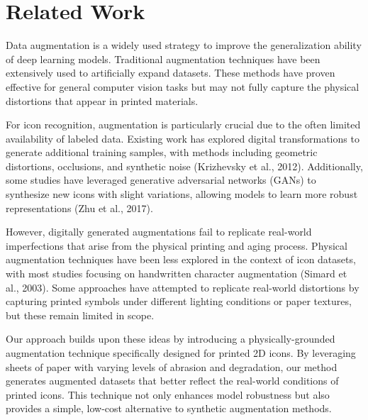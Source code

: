 \section{Related Work}\label{sec:related-work}

Data augmentation is a widely used strategy to improve the generalization ability of deep learning models. Traditional augmentation techniques have been extensively used to artificially expand datasets. These methods have proven effective for general computer vision tasks but may not fully capture the physical distortions that appear in printed materials.

For icon recognition, augmentation is particularly crucial due to the often limited availability of labeled data. Existing work has explored digital transformations to generate additional training samples, with methods including geometric distortions, occlusions, and synthetic noise (Krizhevsky et al., 2012). Additionally, some studies have leveraged generative adversarial networks (GANs) to synthesize new icons with slight variations, allowing models to learn more robust representations (Zhu et al., 2017).

However, digitally generated augmentations fail to replicate real-world imperfections that arise from the physical printing and aging process. Physical augmentation techniques have been less explored in the context of icon datasets, with most studies focusing on handwritten character augmentation (Simard et al., 2003). Some approaches have attempted to replicate real-world distortions by capturing printed symbols under different lighting conditions or paper textures, but these remain limited in scope.

Our approach builds upon these ideas by introducing a physically-grounded augmentation technique specifically designed for printed 2D icons. By leveraging sheets of paper with varying levels of abrasion and degradation, our method generates augmented datasets that better reflect the real-world conditions of printed icons. This technique not only enhances model robustness but also provides a simple, low-cost alternative to synthetic augmentation methods.